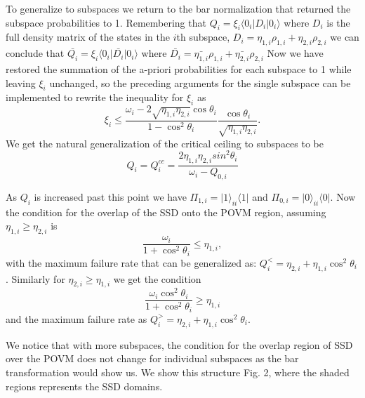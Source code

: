 \documentclass[12pt,oneside,english,reqno]{amsbook}
\numberwithin{section}{chapter}
\numberwithin{equation}{section}
\numberwithin{figure}{section}
\begin{document}
To generalize to subspaces we return to the bar normalization that returned the subspace probabilities to 1.  Remembering that $Q_i =  \xi_i \langle 0_i \vert D_i \vert 0_i \rangle$ where $D_i$ is the full density matrix of the states in the $i$th subspace, $ D_i = \eta_{1,i} \rho_{1,i} + \eta_{2,i} \rho_{2,i}$ we can conclude that $\bar{Q_i} = \xi_i \langle 0_i \vert \bar{D_i} \vert 0_i \rangle$ where $\bar{D_i} = \bar{\eta_{1,i}} \rho_{1,i} + \bar{\eta_{2,i}} \rho_{2,i}$
Now we have restored the summation of the a-priori probabilities for each subspace to 1 while leaving $\xi_i$ unchanged, so the preceding arguments for the single subspace can be implemented to rewrite the inequality for $\xi_i$ as 
\begin{equation} \xi_i \leq \frac{\omega_i-2\sqrt{\eta_{1,i} \eta_{2,i}} \cos \theta_i}{1-\cos^2 \theta_i} \frac{\cos\theta_i}{\sqrt{\eta_{1,i}\eta_{2,i}}}.\nonumber\end{equation} We get the natural generalization of the critical ceiling to subspaces to be
\begin{equation} Q_i = Q^{cc}_i =\frac{2\eta_{1,i} \eta_{2,i} sin^2 \theta_i }{\omega_i-Q_{0,i}}\end{equation} 

As $Q_i$ is increased past this point we have  $\Pi_{1,i} = \vert 1 \rangle_{ii} \langle 1 \vert $ and $\Pi_{0,i} = \vert 0 \rangle_{ii} \langle 0 \vert $. Now the condition for the overlap of the SSD onto the POVM region,  assuming $\eta_{1,i} \geq \eta_{2,i}$ is
 \begin{equation}\frac{\omega_i}{1+\cos^2 \theta_i} \leq \eta_{1,i},\end{equation}
with the maximum failure rate that can be generalized as: $Q^{<}_i = \eta_{2,i} + \eta_{1,i} \cos^2 \theta_i$.
Similarly for $\eta_{2,i} \geq \eta_{1,i}$ we get the condition 
 \begin{equation}\frac{\omega_i \cos^2 \theta_i}{1+\cos^2 \theta_i} \geq \eta_{1,i}\end{equation}
and the maximum failure rate as  $Q^{>}_i = \eta_{2,i} + \eta_{1,i} \cos^2 \theta_i$.


We notice that with more subspaces, the condition for the overlap region of SSD over the POVM does not change for individual subspaces as the bar transformation would show us. We show this structure Fig. 2, where the shaded regions represents the SSD domains.


\bigskip
\end{document}
